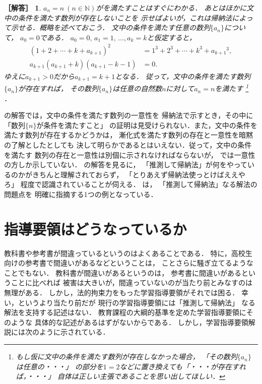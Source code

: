 \documentclass[11pt,a4paper]{ltjsarticle} %
\theoremstyle{mystyle} %
\newtheorem*{ans}{［解答］} %
\begin{document}
\begin{ans}
  $a_n = n \ (n \in \mathbb{N})$がを満たすことはすぐにわかる．
  あとはほかに文中の条件を満たす数列が存在しないことを
  示せばよいが，これは帰納法によって示せる．概略を述べておこう．
  文中の条件を満たす任意の数列$\{ a_n \}$について，
  $a_0 = 0$である．
  $a_0=0, \, a_1=1, \, \ldots, a_k = k$と仮定すると，
  \begin{align*}
    (1+2+ \cdots + k + a_{k+1})^2 & = 1^3 + 2^3 + \cdots + k^3 + {a_{k+1}} ^3, \\
    a_{k+1}(a_{k+1} + k) (a_{k+1} - k - 1) & = 0.
  \end{align*}
    ゆえに$a_{k+1} > 0$だから$a_{k+1} = k+1$となる．
    従って，文中の条件を満たす数列$\{ a_n \}$が\emph{存在すれば}，
    その数列$\{ a_n \}$は任意の自然数$n$に対して$a_n = n$を満たす
    \footnote{
      もし仮に文中の条件を満たす数列が存在しなかった場合，
      「その数列$\{ a_n \}$は任意の・・・」
      の部分を$1=2$などに置き換えても「・・・が存在すれば，・・・」
      自体は正しい主張であることを思い出してほしい．
    }
    ．
\end{ans}

の解答では，文中の条件を満たす数列の一意性を
帰納法で示すとき，その中に「数列$\{ n \}$が条件を満たすこと」
の証明は見受けられない．また，文中の条件を満たす数列が存在するかどうかは，
漸化式を満たす数列の存在と一意性を暗黙の了解としたとしても
決して明らかであるとはいえない．従って，文中の条件を満たす
数列の存在と一意性は別個に示されなければならないが，
\cite{chert}では一意性の方しか示していない．
\cite{chert}の解答を見るに，
「推測して帰納法」が何をやっているのかがきちんと理解されておらず，
「とりあえず帰納法使っとけばええやろ」
程度で認識されていることが伺える．
は，
「推測して帰納法」なる解法の問題点を
明確に指摘する1つの例となっている．



\section{指導要領はどうなっているか}
教科書や参考書が間違っているというのはよくあることである．
特に，高校生向けの参考書で間違いがあるなどということは，
ことさらに騒ぎ立てるようなことでもない．
教科書が間違いがあるというのは，
参考書に間違いがあるということに比べれば
被害は大きいが，間違っていないのが当たり前とみなすのは無理がある．
しかし，法的拘束力をもった学習指導要領がそれでは困る．
幸い，というより当たり前だが
現行の学習指導要領\cite{youryou}には「推測して帰納法」
なる解法を支持する記述はない．
教育課程の大綱的基準を定めた学習指導要領にそのような
具体的な記述があるはずがないからである．
しかし，学習指導要領解説\cite{youryoukai}には次のように示されている．
\end{document}
